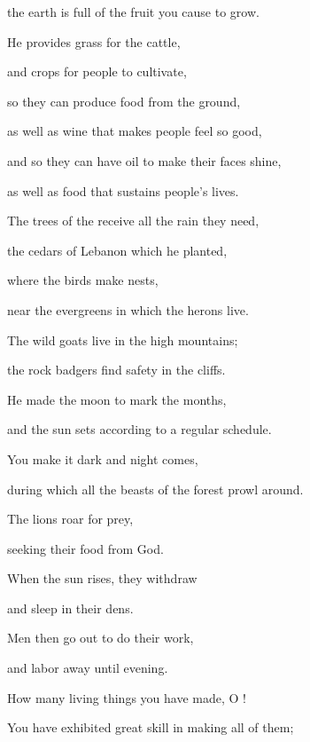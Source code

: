 {\par }{\Q the earth
is full
of the fruit
you cause to grow.
\par }{\Q {}He provides grass
for the cattle,
\par }{\Q and crops
for
people
to cultivate,
\par }{\Q so they can produce
food
from
the ground,
\par }{\Q {}as well as wine
that makes people
feel
so good,
\par }{\Q and so they can have oil
to make their faces
shine,
\par }{\Q as well as food
that sustains
people’s
lives.
\par }{\Q {}The trees
of the {}
receive all the rain they need,
\par }{\Q the cedars
of Lebanon
which
he planted,
\par }{\Q {}where
the birds
make nests,
\par }{\Q near the evergreens
in which the herons live.
\par }{\Q {}The wild goats
live in the high
mountains;
\par }{\Q the rock badgers
find safety
in the cliffs.
\par }{\Q {}He made
the moon
to mark the months,
\par }{\Q and the sun
sets
according to a regular schedule.
\par }{\Q {}You make
it dark
and night
comes,
\par }{\Q during which
all
the beasts
of the forest
prowl around.
\par }{\Q {}The lions
roar
for prey,
\par }{\Q seeking
their food
from God.
\par }{\Q {}When the sun
rises,
they withdraw
\par }{\Q and sleep
in
their dens.
\par }{\Q {}Men
then go out
to do their work,
\par }{\Q and labor
away until
evening.
\par }{\Q {}How
many
living things you have made,
O
{}!

\par }{\Q You have exhibited
great skill
in making
all
of them;

}
